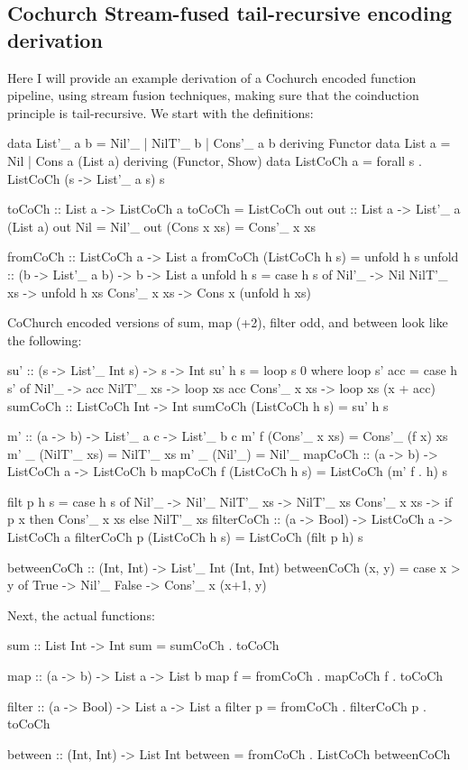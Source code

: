 
\subsection{Cochurch Stream-fused tail-recursive encoding derivation}
Here I will provide an example derivation of a Cochurch encoded function pipeline, using stream fusion techniques, making sure that the coinduction principle is tail-recursive.
We start with the definitions:
\begin{spec}
data List'_ a b = Nil'_ | NilT'_ b | Cons'_ a b deriving Functor
data List a = Nil | Cons a (List a) deriving (Functor, Show)
data ListCoCh a = forall s . ListCoCh (s -> List'_ a s) s

toCoCh :: List a -> ListCoCh a
toCoCh = ListCoCh out
out :: List a -> List'_ a (List a)
out Nil = Nil'_
out (Cons x xs) = Cons'_ x xs

fromCoCh :: ListCoCh a -> List a
fromCoCh (ListCoCh h s) = unfold h s
unfold :: (b -> List'_ a b) -> b -> List a
unfold h s = case h s of
  Nil'_ -> Nil
  NilT'_ xs -> unfold h xs
  Cons'_ x xs -> Cons x (unfold h xs)
\end{spec}
CoChurch encoded versions of sum, map (+2), filter odd, and between look like the following:
\begin{spec}
su' :: (s -> List'_ Int s) -> s -> Int
su' h s = loop s 0
  where loop s' acc = case h s' of
    Nil'_ -> acc
    NilT'_ xs -> loop xs acc
    Cons'_ x xs -> loop xs (x + acc)
sumCoCh :: ListCoCh Int -> Int
sumCoCh (ListCoCh h s) = su' h s

m' :: (a -> b) -> List'_ a c -> List'_ b c
m' f (Cons'_ x xs) = Cons'_ (f x) xs
m' _ (NilT'_ xs) = NilT'_ xs
m' _ (Nil'_) = Nil'_
mapCoCh :: (a -> b) -> ListCoCh a -> ListCoCh b
mapCoCh f (ListCoCh h s) = ListCoCh (m' f . h) s

filt p h s = case h s of
               Nil'_ -> Nil'_
               NilT'_ xs -> NilT'_ xs
               Cons'_ x xs -> if p x then Cons'_ x xs else NilT'_ xs
filterCoCh :: (a -> Bool) -> ListCoCh a -> ListCoCh a
filterCoCh p (ListCoCh h s) = ListCoCh (filt p h) s

betweenCoCh :: (Int, Int) -> List'_ Int (Int, Int)
betweenCoCh (x, y) = case x > y of
  True -> Nil'_
  False -> Cons'_ x (x+1, y)
\end{spec}
Next, the actual functions:
\begin{spec}
sum :: List Int -> Int
sum = sumCoCh . toCoCh

map :: (a -> b) -> List a -> List b
map f = fromCoCh . mapCoCh f . toCoCh

filter :: (a -> Bool) -> List a -> List a
filter p = fromCoCh . filterCoCh p . toCoCh

between :: (Int, Int) -> List Int
between = fromCoCh . ListCoCh betweenCoCh
\end{spec}
